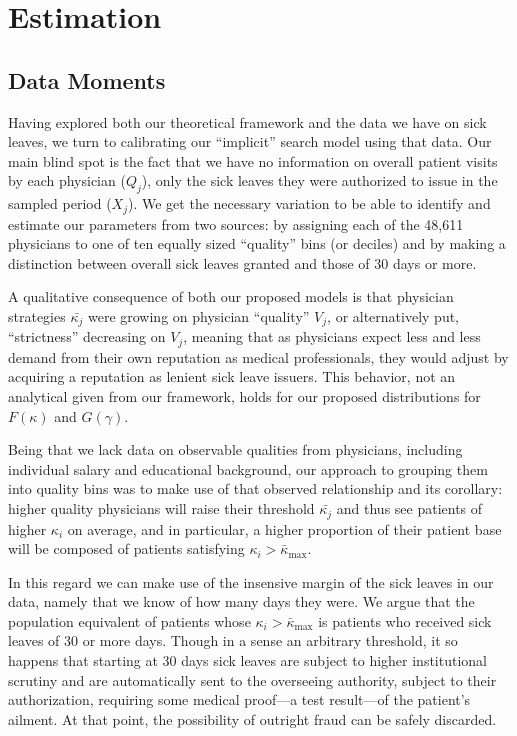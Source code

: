 \documentclass[../main.tex]{subfiles}
\begin{document}
\section{Estimation}

\subsection{Data Moments}
\label{sec:moments}

Having explored both our theoretical framework and the data we have on sick leaves, we turn to calibrating our ``implicit'' search model using that data. Our main blind spot is the fact that we have no information on overall patient visits by each physician ($Q_j$), only the sick leaves they were authorized to issue in the sampled period ($X_j$). We get the necessary variation to be able to identify and estimate our parameters from two sources: by assigning each of the 48,611 physicians to one of ten equally sized ``quality'' bins (or deciles) and by making a distinction between overall sick leaves granted and those of 30 days or more.

A qualitative consequence of both our proposed models is that physician strategies $\bar{\kappa_j}$ were growing on physician ``quality'' $V_j$, or alternatively put, ``strictness'' decreasing on $V_j$, meaning that as physicians expect less and less demand from their own reputation as medical professionals, they would adjust by acquiring a reputation as lenient sick leave issuers. This behavior, not an analytical given from our framework, holds for our proposed distributions for $F(\kappa)$ and $G(\gamma)$.

Being that we lack data on observable qualities from physicians, including individual salary and educational background, our approach to grouping them into quality bins was to make use of that observed relationship and its corollary: higher quality physicians will raise their threshold $\bar{\kappa_j}$ and thus see patients of higher $\kappa_i$ on average, and in particular, a higher proportion of their patient base will be composed of patients satisfying $\kappa_i > \bar{\kappa}_{\max}$.

In this regard we can make use of the insensive margin of the sick leaves in our data, namely that we know of how many days they were. We argue that the population equivalent of patients whose $\kappa_i > \bar{\kappa}_{\max}$ is patients who received sick leaves of 30 or more days. Though in a sense an arbitrary threshold, it so happens that starting at 30 days sick leaves are subject to higher institutional scrutiny and are automatically sent to the overseeing authority, subject to their authorization, requiring some medical proof—a test result—of the patient's ailment. At that point, the possibility of outright fraud can be safely discarded.
\end{document}
